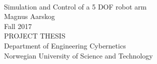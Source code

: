 \documentclass[10pt,b5paper,twoside,openright]{book}
\begin{document}
\pagestyle{plain}

\thispagestyle{empty}
\mbox{}\\[6pc]
\begin{center}
\Huge{Simulation and Control of a 5 DOF robot arm}\\[2pc]

\Large{Magnus Aarskog}\\[1pc]
\large{Fall 2017}\\[2pc]

PROJECT THESIS\\
Department of Engineering Cybernetics\\
Norwegian University of Science and Technology
\end{center}
\vfill


\frontmatter
\pagestyle{plain}
\begingroup
\let\cleardoublepage\clearpage



\tableofcontents \clearpage
\listoftables    \clearpage
\listoffigures   \clearpage
\endgroup



\mainmatter
\pagestyle{headings}







%
%
%
%


\backmatter
{}

\end{document}
